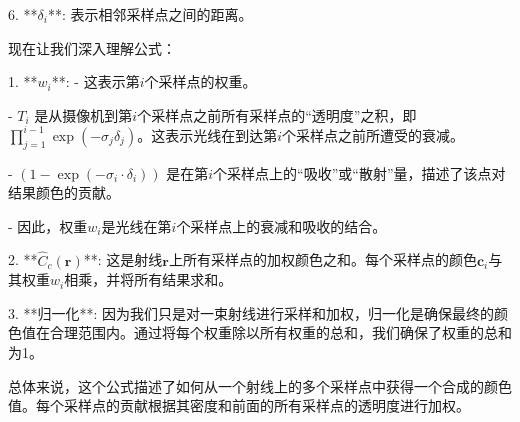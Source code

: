 \documentclass[12pt]{ctexart}
\numberwithin{figure}{section}
\begin{document}
6. **\(\delta_{i}\)**: 表示相邻采样点之间的距离。

现在让我们深入理解公式：

1. **\(w_{i}\)**:
   - 这表示第\(i\)个采样点的权重。

   - \(T_{i}\) 是从摄像机到第\(i\)个采样点之前所有采样点的“透明度”之积，即\(\prod_{j=1}^{i-1} \exp(-\sigma_j \delta_j)\)。这表示光线在到达第\(i\)个采样点之前所遭受的衰减。
   
   - \(\left(1-\exp \left(-\sigma_{i} \cdot \delta_{i}\right)\right)\) 是在第\(i\)个采样点上的“吸收”或“散射”量，描述了该点对结果颜色的贡献。
   
   - 因此，权重\(w_{i}\)是光线在第\(i\)个采样点上的衰减和吸收的结合。

2. **\(\hat{C}_{c}(\boldsymbol{r})\)**: 这是射线\(\boldsymbol{r}\)上所有采样点的加权颜色之和。每个采样点的颜色\(\boldsymbol{c}_{i}\)与其权重\(w_{i}\)相乘，并将所有结果求和。

3. **归一化**: 因为我们只是对一束射线进行采样和加权，归一化是确保最终的颜色值在合理范围内。通过将每个权重除以所有权重的总和，我们确保了权重的总和为1。

总体来说，这个公式描述了如何从一个射线上的多个采样点中获得一个合成的颜色值。每个采样点的贡献根据其密度和前面的所有采样点的透明度进行加权。
\end{document}
